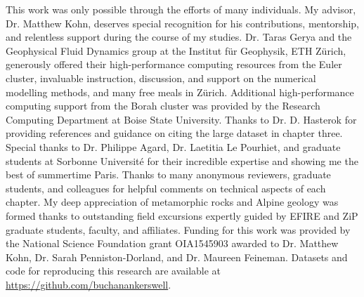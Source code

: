 This work was only possible through the efforts of many individuals. My advisor, Dr. Matthew Kohn, deserves special recognition for his contributions, mentorship, and relentless support during the course of my studies. Dr. Taras Gerya and the Geophysical Fluid Dynamics group at the Institut für Geophysik, ETH Zürich, generously offered their high-performance computing resources from the Euler cluster, invaluable instruction, discussion, and support on the numerical modelling methods, and many free meals in Zürich. Additional high-performance computing support from the Borah cluster was provided by the Research Computing Department at Boise State University. Thanks to Dr. D. Hasterok for providing references and guidance on citing the large dataset in chapter three. Special thanks to Dr. Philippe Agard, Dr. Laetitia Le Pourhiet, and graduate students at Sorbonne Université for their incredible expertise and showing me the best of summertime Paris. Thanks to many anonymous reviewers, graduate students, and colleagues for helpful comments on technical aspects of each chapter. My deep appreciation of metamorphic rocks and Alpine geology was formed thanks to outstanding field excursions expertly guided by EFIRE and ZiP graduate students, faculty, and affiliates. Funding for this work was provided by the National Science Foundation grant OIA1545903 awarded to Dr. Matthew Kohn, Dr. Sarah Penniston-Dorland, and Dr. Maureen Feineman. Datasets and code for reproducing this research are available at \url{https://github.com/buchanankerswell}.